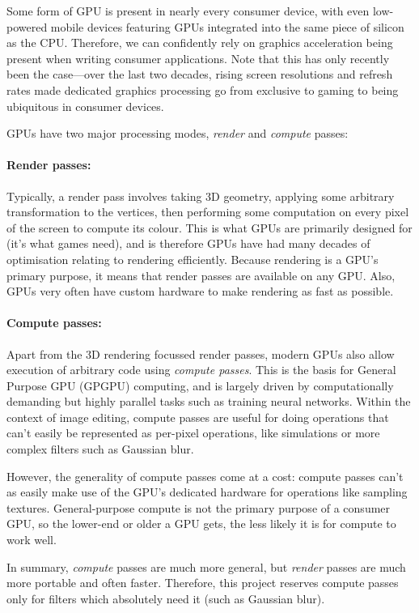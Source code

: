 \documentclass[12pt]{article}
\begin{document}
Some form of GPU is present in nearly every consumer device, with even low-powered mobile devices
featuring GPUs integrated into the same piece of silicon as the CPU.  Therefore, we can confidently
rely on graphics acceleration being present when writing consumer applications.  Note that this has
only recently been the case---over the last two decades, rising screen resolutions and refresh
rates made dedicated graphics processing go from exclusive to gaming to being ubiquitous in consumer
devices.

GPUs have two major processing modes, \emph{render} and \emph{compute} passes:

\paragraph{Render passes:} Typically, a render pass involves taking 3D geometry, applying some
arbitrary transformation to the vertices, then performing some computation on every pixel of the
screen to compute its colour.  This is what GPUs are primarily designed for (it's what games need),
and is therefore GPUs have had many decades of optimisation relating to rendering efficiently.
Because rendering is a GPU's primary purpose, it means that render passes are available on any GPU.
Also, GPUs very often have custom hardware to make rendering as fast as possible.

\paragraph{Compute passes:} Apart from the 3D rendering focussed render passes, modern GPUs also
allow execution of arbitrary code using \emph{compute passes}.  This is the basis for General
Purpose GPU (GPGPU) computing, and is largely driven by computationally demanding but highly
parallel tasks such as training neural networks.  Within the context of image editing, compute
passes are useful for doing operations that can't easily be represented as per-pixel operations,
like simulations or more complex filters such as Gaussian blur.

However, the generality of compute passes come at a cost: compute passes can't as easily make use of
the GPU's dedicated hardware for operations like sampling textures.  General-purpose compute is not
the primary purpose of a consumer GPU, so the lower-end or older a GPU gets, the less likely it is
for compute to work well.

In summary, \emph{compute} passes are much more general, but \emph{render} passes are much more
portable and often faster.  Therefore, this project reserves compute passes only for filters which
absolutely need it (such as Gaussian blur).
\end{document}
